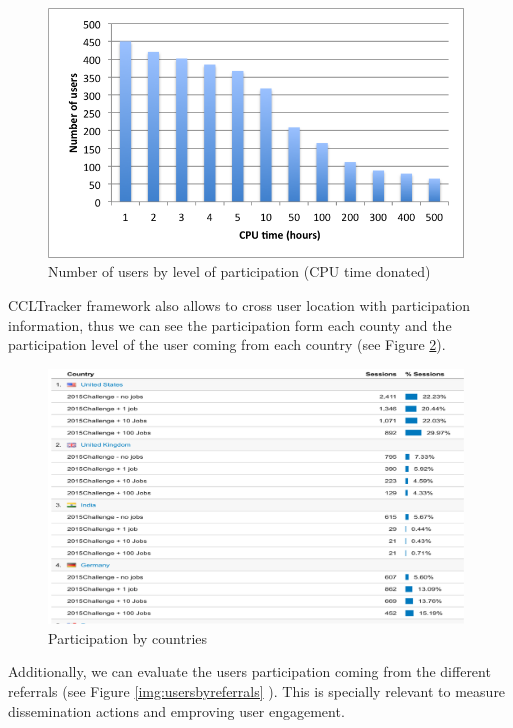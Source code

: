 \documentclass{article}
\begin{document}
\begin{figure}[t]
  \begin{center}
		\includegraphics[width=11cm]{imgs/usersbycputime.png}
  \end{center}
\caption{Number of users by level of participation (CPU time donated)}
\label{img:usersbycputime}
\end{figure}



CCLTracker framework also allows to cross user location with participation information, thus we can see the participation form each county and the participation level of the user coming from each country (see Figure \ref{img:Participationbycountry}).



\begin{figure}[t]
  \begin{center}
		\includegraphics[width=11cm]{imgs/participationByCountry.png}
  \end{center}
\caption{Participation by countries}
\label{img:Participationbycountry}
\end{figure}


Additionally, we can evaluate the users participation coming from the different referrals (see Figure \ref{img:usersbyreferrals} ). This is specially relevant to measure dissemination actions and emproving user engagement.
\end{document}
